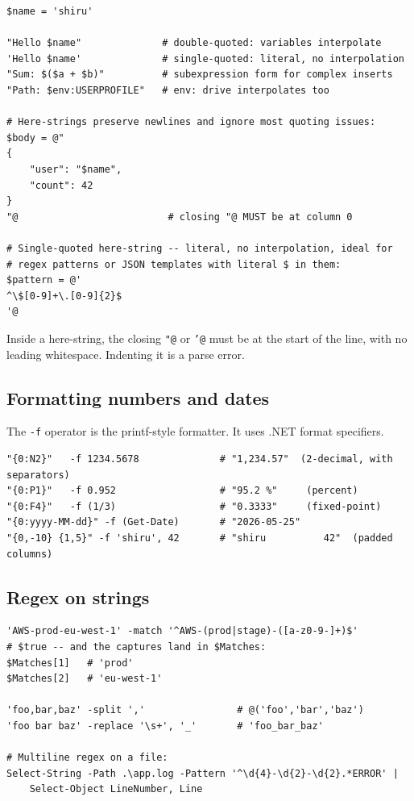 \documentclass[11pt,a4paper]{article}
\begin{document}
\begin{lstlisting}[style=pwshstyle]
$name = 'shiru'

"Hello $name"              # double-quoted: variables interpolate
'Hello $name'              # single-quoted: literal, no interpolation
"Sum: $($a + $b)"          # subexpression form for complex inserts
"Path: $env:USERPROFILE"   # env: drive interpolates too

# Here-strings preserve newlines and ignore most quoting issues:
$body = @"
{
    "user": "$name",
    "count": 42
}
"@                          # closing "@ MUST be at column 0

# Single-quoted here-string -- literal, no interpolation, ideal for
# regex patterns or JSON templates with literal $ in them:
$pattern = @'
^\$[0-9]+\.[0-9]{2}$
'@
\end{lstlisting}

\begin{gotcha}
Inside a here-string, the closing \texttt{"@} or \texttt{'@} must be
at the start of the line, with no leading whitespace. Indenting it
is a parse error.
\end{gotcha}

\subsection*{Formatting numbers and dates}

The \texttt{-f} operator is the printf-style formatter. It uses .NET
format specifiers.

\begin{lstlisting}[style=pwshstyle]
"{0:N2}"   -f 1234.5678              # "1,234.57"  (2-decimal, with separators)
"{0:P1}"   -f 0.952                  # "95.2 %"     (percent)
"{0:F4}"   -f (1/3)                  # "0.3333"     (fixed-point)
"{0:yyyy-MM-dd}" -f (Get-Date)       # "2026-05-25"
"{0,-10} {1,5}" -f 'shiru', 42       # "shiru          42"  (padded columns)
\end{lstlisting}

\subsection*{Regex on strings}

\begin{lstlisting}[style=pwshstyle]
'AWS-prod-eu-west-1' -match '^AWS-(prod|stage)-([a-z0-9-]+)$'
# $true -- and the captures land in $Matches:
$Matches[1]   # 'prod'
$Matches[2]   # 'eu-west-1'

'foo,bar,baz' -split ','                # @('foo','bar','baz')
'foo bar baz' -replace '\s+', '_'       # 'foo_bar_baz'

# Multiline regex on a file:
Select-String -Path .\app.log -Pattern '^\d{4}-\d{2}-\d{2}.*ERROR' |
    Select-Object LineNumber, Line
\end{lstlisting}
\end{document}
